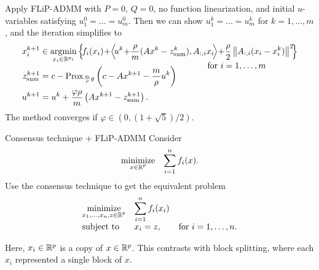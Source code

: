 \documentclass[10pt,mathserif]{beamer}
\begin{document}
\begin{frame}
Apply FLiP-ADMM with $P=0$, $Q=0$, no function linearization, and initial $u$-variables satisfying $u_1^0=\dots=u_m^0$. Then we can show $u_1^k=\dots=u_m^k$ for $k=1,\dots,m$, and the iteration simplifies to
\begin{alignat*}{3}
x^{k+1}_i &\in \operatorname*{argmin}_{x_i\in \mathbb{R}^{p_i}} \left\{\hspace{-2pt} f_i(x_i)
\hspace{-2pt}+\hspace{-2pt}
\left<\hspace{-2pt} u^k
\hspace{-2pt}+\hspace{-2pt}
\frac{\rho}{m}(Ax^{k}-z_\mathrm{sum}^k), A_{:,i}x_i\hspace{-2pt}\right> \hspace{-2pt}+\hspace{-2pt}
\frac{\rho}{2}\left\|A_{:,i}(x_i-x_i^k)\right\|^2 \hspace{-2pt}\right\}\\[-0.6em]
&\hspace{2.7in}\text{for }i=1,\dots,m\\[-1.em]
z_\mathrm{sum}^{k+1}&=c-\mathrm{Prox}_{\frac{m}{\rho}g}\left(c-Ax^{k+1}-\frac{m}{\rho}u^k\right)\\
u^{k+1}&=u^{k}+\frac{\varphi\rho}{m}\left(Ax^{k+1}-z_\mathrm{sum}^{k+1}\right).
\end{alignat*}
The method converges if $\varphi\in(0,(1+\sqrt{5})/2)$.
\end{frame}

\begin{frame}{Consensus technique + FLiP-ADMM}
Consider
\[
\begin{array}{ll}
\underset{\substack{x\in \mathbb{R}^p}}{\mbox{minimize}}&\displaystyle{\sum^n_{i=1}f_i(x)}.
\end{array}
\]
Use the consensus technique to get the equivalent problem
\[
\begin{array}{ll}
\underset{\substack{x_1,\dots,x_n,z\in \mathbb{R}^p}}{\mbox{minimize}}&\displaystyle{\sum^n_{i=1}f_i(x_i)}\\
\mbox{subject to}&x_i=z,\qquad  \text{for }i=1,\dots,n.
\end{array}
\]

Here, $x_i\in\mathbb{R}^p$ is a copy of $x\in\mathbb{R}^p$. This contrasts with block splitting, where each $x_i$ represented a single block of $x$.
\end{frame}
\end{document}

